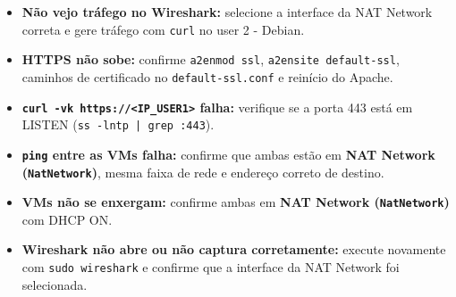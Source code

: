 \begin{itemize}
  \item \textbf{Não vejo tráfego no Wireshark:} selecione a interface da NAT Network correta e gere tráfego com \texttt{curl} no user 2 - Debian.
  \item \textbf{HTTPS não sobe:} confirme \texttt{a2enmod ssl}, \texttt{a2ensite default-ssl}, caminhos de certificado no \texttt{default-ssl.conf} e reinício do Apache.
  \item \textbf{\texttt{curl -vk https://<IP\_USER1>} falha:} verifique se a porta 443 está em LISTEN (\texttt{ss -lntp | grep :443}).
  \item \textbf{\texttt{ping} entre as VMs falha:} confirme que ambas estão em \textbf{NAT Network (\texttt{NatNetwork})}, mesma faixa de rede e endereço correto de destino.
  \item \textbf{VMs não se enxergam:} confirme ambas em \textbf{NAT Network (\texttt{NatNetwork})} com DHCP ON.
  \item \textbf{Wireshark não abre ou não captura corretamente:} execute novamente com \texttt{sudo wireshark} e confirme que a interface da NAT Network foi selecionada.
\end{itemize}


